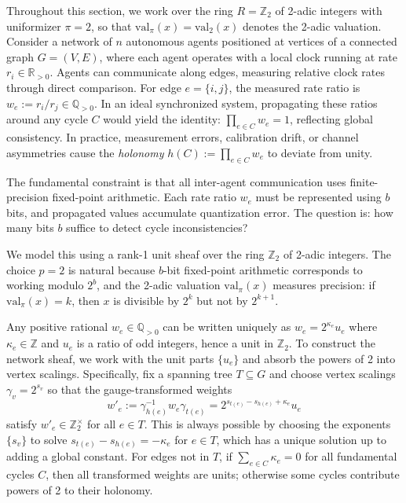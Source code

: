 \documentclass[11pt]{amsart}
\theoremstyle{plain}
\theoremstyle{definition}
\newcommand{\valpi}{\mathrm{val}_{\unif}}                   %
\newcommand{\Ring}{R}                          %
\newcommand{\unif}{\pi}                        %
\begin{document}
Throughout this section, we work over the ring $\Ring = \mathbb{Z}_2$ of 2-adic integers with uniformizer $\unif = 2$, so that $\valpi(x) = \mathrm{val}_2(x)$ denotes the 2-adic valuation. Consider a network of $n$ autonomous agents positioned at vertices of a connected graph $G = (V,E)$, where each agent operates with a local clock running at rate $r_i \in \mathbb{R}_{>0}$. Agents can communicate along edges, measuring relative clock rates through direct comparison. For edge $e = \{i,j\}$, the measured rate ratio is $w_e := r_i/r_j \in \mathbb{Q}_{>0}$. In an ideal synchronized system, propagating these ratios around any cycle $C$ would yield the identity: $\prod_{e \in C} w_e = 1$, reflecting global consistency. In practice, measurement errors, calibration drift, or channel asymmetries cause the \emph{holonomy} $h(C) := \prod_{e \in C} w_e$ to deviate from unity.

The fundamental constraint is that all inter-agent communication uses finite-precision fixed-point arithmetic. Each rate ratio $w_e$ must be represented using $b$ bits, and propagated values accumulate quantization error. The question is: how many bits $b$ suffice to detect cycle inconsistencies?

We model this using a rank-1 unit sheaf over the ring $\mathbb{Z}_2$ of 2-adic integers. The choice $p=2$ is natural because $b$-bit fixed-point arithmetic corresponds to working modulo $2^b$, and the 2-adic valuation $\valpi(x)$ measures precision: if $\valpi(x) = k$, then $x$ is divisible by $2^k$ but not by $2^{k+1}$.

Any positive rational $w_e \in \mathbb{Q}_{>0}$ can be written uniquely as $w_e = 2^{\kappa_e} u_e$ where $\kappa_e \in \mathbb{Z}$ and $u_e$ is a ratio of odd integers, hence a unit in $\mathbb{Z}_2$. To construct the network sheaf, we work with the unit parts $\{u_e\}$ and absorb the powers of 2 into vertex scalings. Specifically, fix a spanning tree $T \subseteq G$ and choose vertex scalings $\gamma_v = 2^{s_v}$ so that the gauge-transformed weights
\[
w'_e := \gamma_{h(e)}^{-1} w_e \gamma_{t(e)} = 2^{s_{t(e)} - s_{h(e)} + \kappa_e} u_e
\]
satisfy $w'_e \in \mathbb{Z}_2^\times$ for all $e \in T$. This is always possible by choosing the exponents $\{s_v\}$ to solve $s_{t(e)} - s_{h(e)} = -\kappa_e$ for $e \in T$, which has a unique solution up to adding a global constant. For edges not in $T$, if $\sum_{e \in C} \kappa_e = 0$ for all fundamental cycles $C$, then all transformed weights are units; otherwise some cycles contribute powers of 2 to their holonomy.
\end{document}
